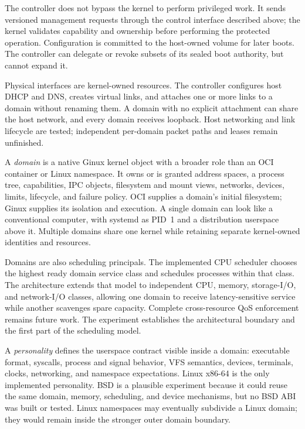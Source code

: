 \documentclass[11pt]{article}
\begin{document}
The controller does not bypass the kernel to perform privileged work. It sends
versioned management requests through the control interface described above;
the kernel validates capability and ownership before performing the protected
operation. Configuration is committed to the host-owned volume for later
boots. The controller can delegate or revoke subsets of its sealed boot
authority, but cannot expand it.

Physical interfaces are kernel-owned resources. The controller configures host
DHCP and DNS, creates virtual links, and attaches one or more links to a domain
without renaming them. A domain with no explicit attachment can share the host
network, and every domain receives loopback. Host networking and link lifecycle
are tested; independent per-domain packet paths and leases remain unfinished.

A \emph{domain} is a native Ginux kernel object with a broader role than an OCI
container or Linux namespace. It owns or is granted address spaces, a process tree,
capabilities, IPC objects, filesystem and mount views, networks, devices,
limits, lifecycle, and failure policy. OCI supplies a domain's initial
filesystem; Ginux supplies its isolation and execution. A single domain can
look like a conventional computer, with systemd as PID~1 and a distribution
userspace above it. Multiple domains share one kernel while retaining separate
kernel-owned identities and resources.

Domains are also scheduling principals. The implemented CPU scheduler chooses
the highest ready domain service class and schedules processes within that
class. The architecture extends that model to independent CPU, memory,
storage-I/O, and network-I/O classes, allowing one domain to receive
latency-sensitive service while another scavenges spare capacity. Complete
cross-resource QoS enforcement remains future work. The experiment establishes
the architectural boundary and the first part of the scheduling model.

A \emph{personality} defines the userspace contract visible inside a domain:
executable format, syscalls, process and signal behavior, VFS semantics,
devices, terminals, clocks, networking, and namespace expectations. Linux
x86-64 is the only implemented personality. BSD is a plausible experiment
because it could reuse the same domain, memory, scheduling, and device
mechanisms, but no BSD ABI was built or tested. Linux namespaces may eventually
subdivide a Linux domain; they would remain inside the stronger outer domain
boundary.
\end{document}

